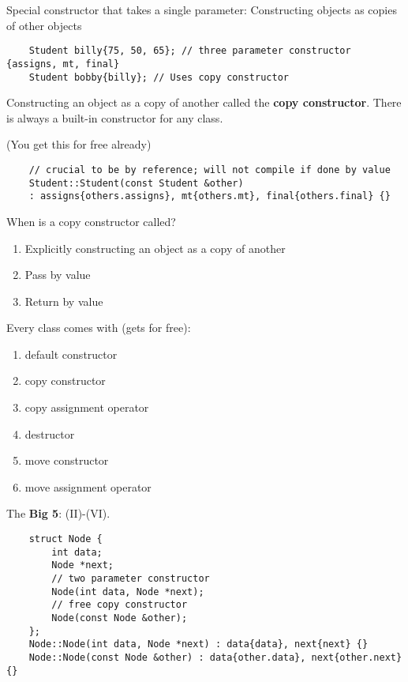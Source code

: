 Special constructor that takes a single parameter: Constructing objects
as copies of other objects

\begin{lstlisting}
    Student billy{75, 50, 65}; // three parameter constructor {assigns, mt, final}
    Student bobby{billy}; // Uses copy constructor
\end{lstlisting}
Constructing an object as a copy of another called the \textbf{copy constructor}.
There is always a built-in constructor for any class.

 (You get this for free already)
\begin{lstlisting}
    // crucial to be by reference; will not compile if done by value
    Student::Student(const Student &other)
    : assigns{others.assigns}, mt{others.mt}, final{others.final} {}
\end{lstlisting}
When is a copy constructor called?
\begin{enumerate}[label=(\arabic*)]
    \item Explicitly constructing an object as a copy of another
    \item Pass by value
    \item Return by value
\end{enumerate}
Every class comes with (gets for free):
\begin{enumerate}[label=(\Roman*)]
    \item default constructor
    \item copy constructor
    \item copy assignment operator
    \item destructor
    \item move constructor
    \item move assignment operator
\end{enumerate}
The \textbf{Big 5}: (II)-(VI).

\begin{lstlisting}
    struct Node {
        int data;
        Node *next;
        // two parameter constructor
        Node(int data, Node *next);
        // free copy constructor
        Node(const Node &other);
    };
    Node::Node(int data, Node *next) : data{data}, next{next} {}
    Node::Node(const Node &other) : data{other.data}, next{other.next} {}
\end{lstlisting}

